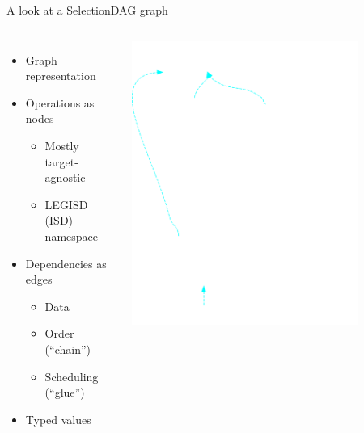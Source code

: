 \begin{frame}{A look at a SelectionDAG graph}

\begin{columns}[t]
    \begin{itemize}
        \item Graph representation
        \item Operations as nodes
        \begin{itemize}
            \item Mostly target-agnostic
            \item LEGISD (ISD) namespace
        \end{itemize}
        \item Dependencies as edges
        \begin{itemize}
            \item Data
            \item Order (“chain”)
            \item Scheduling (“glue”)
        \end{itemize}
        \item Typed values
    \end{itemize}
    \begin{block}{}
        \includegraphics[width = 0.8\textwidth]{examples/ex1-entry-selection-dag.png}
    \end{block}
\end{columns}

\end{frame}


